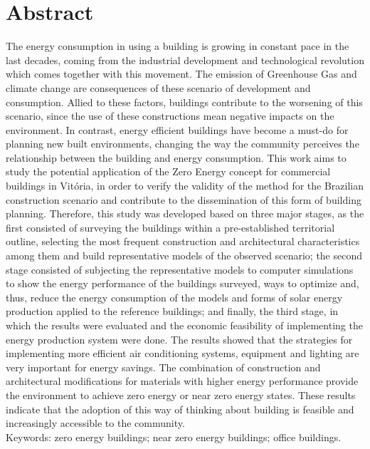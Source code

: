 \section*{Abstract}
    The  energy  consumption  in  using  a  building  is  growing  in  constant
    pace  in  the  last  decades, coming from the industrial development and 
    technological revolution which comes together with this movement. 
    The emission of Greenhouse Gas and climate change are consequences of these 
    scenario  of  development  and  consumption.  Allied  to  these  factors,  
    buildings  contribute  to  the worsening of this scenario, since the use of 
    these  constructions mean negative  impacts on  the environment.  In  contrast,  
    energy  efficient  buildings  have  become  a  must-do  for  planning  
    new built  environments,  changing  the  way  the  community  perceives  
    the  relationship  between  the building and energy consumption. This work 
    aims to study the potential application of the Zero Energy concept for commercial 
    buildings in Vitória, in order to verify the validity of the method for the 
    Brazilian construction scenario and contribute to the dissemination of this 
    form of building planning. Therefore, this study was developed based on three 
    major stages, as the first consisted of surveying the buildings within a 
    pre-established territorial outline, selecting the most frequent construction  
    and  architectural  characteristics  among  them  and  build  representative  
    models  of the  observed  scenario;  the  second  stage  consisted  of  subjecting  
    the  representative  models  to computer  simulations  to  show  the  energy  
    performance  of  the  buildings  surveyed,  ways  to optimize  and,  
    thus,  reduce  the  energy  consumption  of  the  models  and  forms  of  solar  
    energy production  applied  to  the  reference  buildings;  and  finally,  
    the  third  stage,  in  which  the  results were evaluated and the economic 
    feasibility of implementing the energy production system were done.  
    The  results  showed  that  the  strategies  for  implementing  more  efficient  
    air  conditioning systems,  equipment  and  lighting  are  very  important  
    for  energy  savings.  The  combination  of construction  and  architectural  
    modifications  for  materials  with  higher  energy  performance provide the 
    environment to achieve zero energy or near zero energy states. 
    These results indicate that the adoption of this way of thinking about building 
    is feasible and increasingly accessible to the community.\\

    \noindent Keywords: zero energy buildings; near zero energy buildings; office buildings.
    \pagebreak